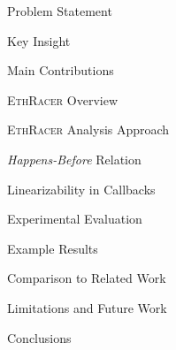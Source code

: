 \documentclass[9pt]{beamer}
\begin{document}
%
\begin{frame}{Problem Statement}
\end{frame}
%
\begin{frame}{Key Insight}
\end{frame}
%
\begin{frame}{Main Contributions}
\end{frame}
%
\begin{frame}{\textsc{EthRacer} Overview}
\end{frame}
%
\begin{frame}{\textsc{EthRacer} Analysis Approach}
\end{frame}
%
\begin{frame}{\textit{Happens-Before} Relation}
\end{frame}
%
\begin{frame}{Linearizability in Callbacks}
\end{frame}
%
\begin{frame}{Experimental Evaluation}
\end{frame}
%
\begin{frame}{Example Results}
\end{frame}
%
\begin{frame}{Comparison to Related Work}
\end{frame}
%
\begin{frame}{Limitations and Future Work}
\end{frame}
%
\begin{frame}{Conclusions}
\end{frame}
%
\begin{frame}{}
  \centering\huge\sffamily
  \textbf{}
\end{frame}
%
\begin{frame}[allowframebreaks]{}
  \scriptsize
  
  
\end{frame}
%
\end{document}
